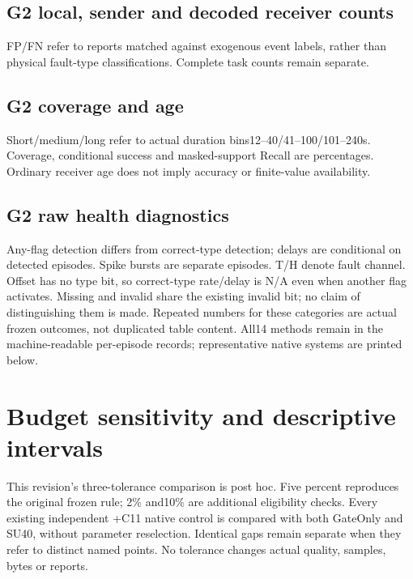 \documentclass[10pt]{article}
\begin{document}
\subsection{G2 local, sender and decoded receiver counts}
FP/FN refer to reports matched against exogenous event labels, rather than physical fault-type classifications. Complete task counts remain separate.

\subsection{G2 coverage and age}
Short/medium/long refer to actual duration bins12--40/41--100/101--240s. Coverage, conditional success and masked-support Recall are percentages. Ordinary receiver age does not imply accuracy or finite-value availability.
\begin{table}[htbp]\centering\small\caption{G2 event support coverage and success.}
\label{tab:transferboundary}\end{table}
\begin{table}[htbp]\centering\small\caption{G2 uploads, bytes/upload, mean and pooled P95/max age, and missed event/health edges.}
\label{tab:transfercommunication}\end{table}
\clearpage
\subsection{G2 raw health diagnostics}
Any-flag detection differs from correct-type detection; delays are conditional on detected episodes. Spike bursts are separate episodes. T/H denote fault channel. Offset has no type bit, so correct-type rate/delay is N/A even when another flag activates. Missing and invalid share the existing invalid bit; no claim of distinguishing them is made. Repeated numbers for these categories are actual frozen outcomes, not duplicated table content. All14 methods remain in the machine-readable per-episode records; representative native systems are printed below.


\section{Budget sensitivity and descriptive intervals}\label{app:sensitivity}
This revision's three-tolerance comparison is post hoc. Five percent reproduces the original frozen rule; 2\% and10\% are additional eligibility checks. Every existing independent +C11 native control is compared with both GateOnly and SU40, without parameter reselection. Identical gaps remain separate when they refer to distinct named points. No tolerance changes actual quality, samples, bytes or reports.

\begin{table}[htbp]\centering\small\caption{Selected existing seed-paired, pointwise, unadjusted intervals. These descriptive endpoints do not constitute a multiplicity-controlled confirmatory test.}
\label{tab:intervals}\end{table}
\end{document}
